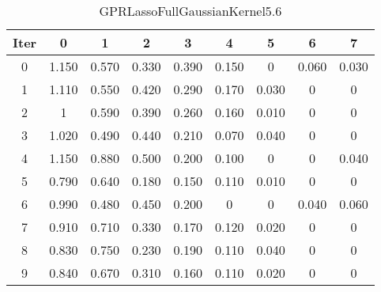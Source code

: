 \begin{table}
	\begin{center}
		\begin{tabular}{|c|c|c|c|c|c|c|c|c|}
			\hline
			Iter & 0 & 1 & 2 & 3 & 4 & 5 & 6 & 7 \\
			\hline
			0 & 1.150 & 0.570 & 0.330 & 0.390 & 0.150 & 0 & 0.060 & 0.030 \\
			\hline
			1 & 1.110 & 0.550 & 0.420 & 0.290 & 0.170 & 0.030 & 0 & 0 \\
			\hline
			2 & 1 & 0.590 & 0.390 & 0.260 & 0.160 & 0.010 & 0 & 0 \\
			\hline
			3 & 1.020 & 0.490 & 0.440 & 0.210 & 0.070 & 0.040 & 0 & 0 \\
			\hline
			4 & 1.150 & 0.880 & 0.500 & 0.200 & 0.100 & 0 & 0 & 0.040 \\
			\hline
			5 & 0.790 & 0.640 & 0.180 & 0.150 & 0.110 & 0.010 & 0 & 0 \\
			\hline
			6 & 0.990 & 0.480 & 0.450 & 0.200 & 0 & 0 & 0.040 & 0.060 \\
			\hline
			7 & 0.910 & 0.710 & 0.330 & 0.170 & 0.120 & 0.020 & 0 & 0 \\
			\hline
			8 & 0.830 & 0.750 & 0.230 & 0.190 & 0.110 & 0.040 & 0 & 0 \\
			\hline
			9 & 0.840 & 0.670 & 0.310 & 0.160 & 0.110 & 0.020 & 0 & 0 \\
			\hline
		\end{tabular}
	\end{center}
	\caption{GPRLassoFullGaussianKernel5.6}
\end{table}